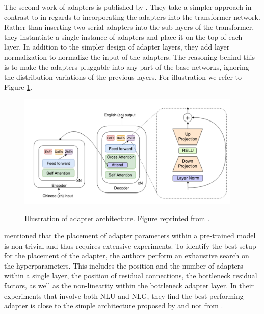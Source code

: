 The second work of adapters is published by \cite{bapna2019simple}. They take a simpler approach in contrast to \cite{houlsby2019parameter} in regards to incorporating the adapters into the transformer network. Rather than inserting two serial adapters into the sub-layers of the transformer, they instantiate a single instance of adapters and place it on the top of each layer. In addition to the simpler design of adapter layers, they add layer normalization to normalize the input of the adapters. The reasoning behind this is to make the adapters pluggable into any part of the base networks, ignoring the distribution variations of the previous layers. For illustration we refer to Figure \ref{img:ada_bapna}.

\begin{figure}[h]
    {\includegraphics[width=0.95\textwidth]{img/adapter_bapna.png}}
    \centering
    \caption{Illustration of adapter architecture. Figure reprinted from \cite{bapna2019simple}.}
    \label{img:ada_bapna}
\end{figure}

\cite{pfeiffer2021adapterfusion} mentioned that the placement of adapter parameters within a pre-trained model is non-trivial and thus requires extensive experiments. To identify the best setup for the placement of the adapter, the authors perform an exhaustive search on the hyperparameters. This includes the position and the number of adapters within a single layer, the position of residual connections, the bottleneck residual factors, as well as the non-linearity within the bottleneck adapter layer. In their experiments that involve both NLU and NLG, they find the best performing adapter is close to the simple architecture proposed by \cite{bapna2019simple} and not from \cite{houlsby2019parameter}.

